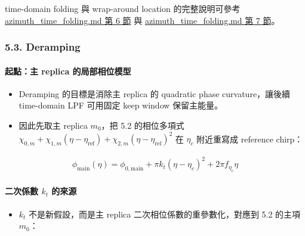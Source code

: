\documentclass[11pt]{article}
\providecommand{\tightlist}{%
  \setlength{\itemsep}{0pt}\setlength{\parskip}{0pt}}
\begin{document}
time-domain folding 與 wrap-around location 的完整說明可參考
\href{./azimuth_time_folding.md\#6-circular-convolution-and-wrap-around}{azimuth\_time\_folding.md 第 6 節}
與
\href{./azimuth_time_folding.md\#7-wrap-around-location-formula}{azimuth\_time\_folding.md 第 7 節}。

\hypertarget{deramping-1}{%
\subsubsection{5.3. Deramping}\label{deramping-1}}

\hypertarget{ux8d77ux9edeux4e3b-replica-ux7684ux5c40ux90e8ux76f8ux4f4dux6a21ux578b}{%
\paragraph{起點：主 replica
的局部相位模型}\label{ux8d77ux9edeux4e3b-replica-ux7684ux5c40ux90e8ux76f8ux4f4dux6a21ux578b}}

\begin{itemize}
\tightlist
\item
  Deramping 的目標是消除主 replica 的 quadratic phase curvature，讓後續
  time-domain LPF 可用固定 keep window 保留主能量。
\item
  因此先取主 replica \(m_0\)，把 5.2 的相位多項式
  \(\chi_{0,m}+\chi_{1,m}(\eta-\eta_{\mathrm{ref}})+\chi_{2,m}(\eta-\eta_{\mathrm{ref}})^2\)
  在 \(\eta_c\) 附近重寫成 reference chirp：
\end{itemize}

\begin{equation}
\begin{aligned}
\phi_{\mathrm{main}}(\eta)=\phi_{0,\mathrm{main}}+\pi k_t(\eta-\eta_c)^2+2\pi f_{\eta_c}\eta
\end{aligned}
\end{equation}

\hypertarget{ux4e8cux6b21ux4fc2ux6578-k_t-ux7684ux4f86ux6e90}{%
\paragraph{\texorpdfstring{二次係數 \(k_t\)
的來源}{二次係數 k\_t 的來源}}\label{ux4e8cux6b21ux4fc2ux6578-k_t-ux7684ux4f86ux6e90}}

\begin{itemize}
\tightlist
\item
  \(k_t\) 不是新假設，而是主 replica 二次相位係數的重參數化，對應到 5.2
  的主項 \(m_0\)：
\end{itemize}
\end{document}
